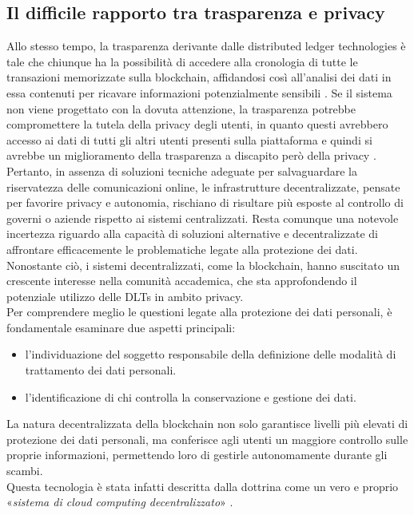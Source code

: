 \subsection{Il difficile rapporto tra trasparenza e privacy}
Allo stesso tempo, la trasparenza derivante dalle distributed ledger technologies è tale che chiunque ha la possibilità di accedere alla
cronologia di tutte le transazioni memorizzate sulla blockchain, affidandosi così all’analisi dei dati in essa contenuti per ricavare informazioni potenzialmente sensibili \cite{marr_history_blockchain_2018}.
Se il sistema non viene progettato con la dovuta attenzione, la trasparenza potrebbe compromettere la tutela della privacy degli utenti, in quanto questi avrebbero
accesso ai dati di tutti gli altri utenti presenti sulla piattaforma e quindi si avrebbe un miglioramento della trasparenza 
a discapito però della privacy \cite{zambardino_blockchain_2022} \cite{mayes_privacy_transparency_2018}.\\
Pertanto, in assenza di soluzioni tecniche adeguate per salvaguardare la riservatezza delle comunicazioni online, le infrastrutture decentralizzate, pensate per favorire privacy e autonomia, 
rischiano di risultare più esposte al controllo di governi o aziende rispetto ai sistemi centralizzati.
Resta comunque una notevole incertezza riguardo alla capacità di soluzioni alternative e decentralizzate di affrontare efficacemente le problematiche legate alla protezione dei dati.
Nonostante ciò, i sistemi decentralizzati, come la blockchain, hanno suscitato un crescente interesse nella comunità accademica, che sta approfondendo il potenziale utilizzo delle DLTs in ambito privacy.
\\Per comprendere meglio le questioni legate alla protezione dei dati personali, è fondamentale esaminare due aspetti principali:
\begin{itemize}
    \item l'individuazione del soggetto responsabile della definizione delle modalità di trattamento dei dati personali.
    \item l'identificazione di chi controlla la conservazione e gestione dei dati.
\end{itemize}
La natura decentralizzata della blockchain non solo garantisce livelli più elevati di protezione dei dati personali, ma conferisce agli utenti un maggiore controllo sulle proprie informazioni, permettendo loro di gestirle autonomamente durante gli scambi. \\Questa tecnologia è stata infatti descritta dalla dottrina come un vero e proprio «\textit{sistema di cloud computing decentralizzato}» \cite{bridge_blockchain_2018}.
